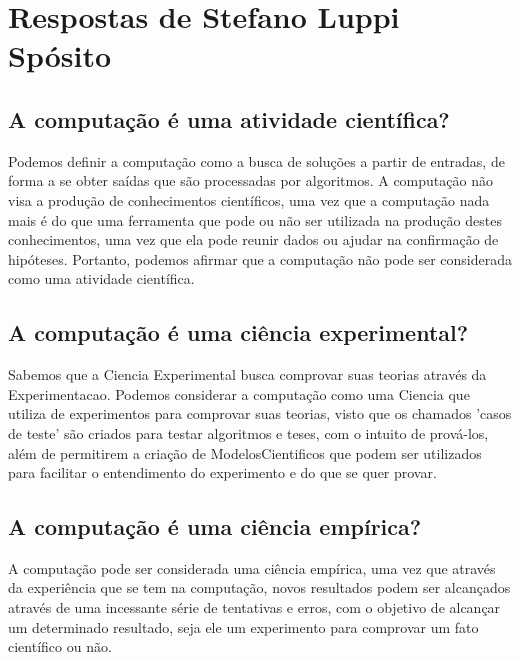 \section{Respostas de Stefano Luppi Spósito}

\subsection{A computação é uma atividade científica?}
Podemos definir a computação como a busca de soluções a partir de entradas, de forma a se obter saídas que são processadas por algoritmos. A computação não visa a produção de conhecimentos científicos, uma vez que a computação nada mais é do que uma ferramenta que pode ou não ser utilizada na produção destes conhecimentos, uma vez que ela pode reunir dados ou ajudar na confirmação de hipóteses.
Portanto, podemos afirmar que a computação não pode ser considerada como uma atividade científica.
\subsection{A computação é uma ciência experimental?}
Sabemos que a \gls{Ciencia} Experimental busca comprovar suas teorias através da \gls{Experimentacao}. Podemos considerar a computação como uma \gls{Ciencia} que utiliza de experimentos para comprovar suas teorias, visto que os chamados 'casos de teste' são criados para testar algoritmos e teses, com o intuito de prová-los, além de permitirem a criação de \gls{ModelosCientificos} que podem ser utilizados para facilitar o entendimento do experimento e do que se quer provar.
\subsection{A computação é uma ciência empírica?}
A computação pode ser considerada uma ciência empírica, uma vez que através da experiência que se tem na computação, novos resultados podem ser alcançados através de uma incessante série de tentativas e erros, com o objetivo de alcançar um determinado resultado, seja ele um experimento para comprovar um fato científico ou não.